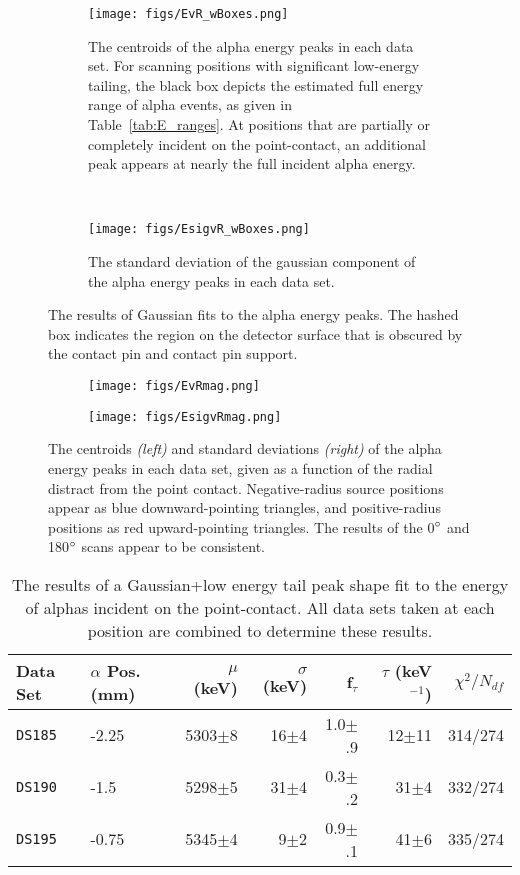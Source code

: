 \documentclass[groupedaddress,rmp,amsmath,amssymb,bibnotes,altaffilletter,twocolumn]{revtex4-1}
\begin{document}
\begin{figure*}[]
 \centering
  \begin{subfigure}[]{.45\textwidth}
 \texttt{[image: figs/EvR\_wBoxes.png]}
 \caption{The centroids of the alpha energy peaks in each data set. For scanning positions with significant low-energy tailing, the black box depicts the estimated full energy range of alpha events, as given in Table~\ref{tab:E_ranges}. At positions that are partially or completely incident on the point-contact, an additional peak appears at nearly the full incident alpha energy. } 
 \label{fig:Efit_mu}
\end{subfigure}
~
\begin{subfigure}[]{.45\textwidth}
 \texttt{[image: figs/EsigvR\_wBoxes.png]}
 \caption{The standard deviation of the gaussian component of the alpha energy peaks in each data set.} 
 \label{fig:Efit_sig}
 \end{subfigure}
 \caption{The results of Gaussian fits to the alpha energy peaks. The hashed box indicates the region on the detector surface that is obscured by the contact pin and contact pin support.}
\end{figure*}

\begin{figure*}[]
 \centering
 \begin{subfigure}[]{.45\textwidth}
 \texttt{[image: figs/EvRmag.png]}
\end{subfigure}
 \begin{subfigure}[]{.45\textwidth}
 \texttt{[image: figs/EsigvRmag.png]}
\end{subfigure}
 \caption{The centroids {\it (left)} and standard deviations {\it (right)} of the alpha energy peaks in each data set, given as a function of the radial distract from the point contact. Negative-radius source positions appear as blue downward-pointing triangles, and positive-radius positions as red upward-pointing triangles. The results of the 0$\degree$ and 180$\degree$ scans appear to be consistent.} 
 \label{fig:Efit_rMag}
\end{figure*}

\begin{table*}[]
\begin{center}
\begin{tabular}{l l r r r r r}
Data Set & $\alpha$ Pos. (mm) & $\mu$ (keV) & $\sigma$ (keV) & f$_{\tau}$ & $\tau$ (keV$^{-1}$)& $\chi^2/N_{df}$ \\  \hline
{\tt DS185} & -2.25 & 5303$\pm$8 & 16$\pm$4 & 1.0$\pm$.9 & 12$\pm$11 & 314/274 \\
{\tt DS190} & -1.5 & 5298$\pm$5 & 31$\pm$4 & 0.3$\pm$.2 & 31$\pm$4 & 332/274 \\
{\tt DS195} & -0.75 & 5345$\pm$4 & 9$\pm$2 & 0.9$\pm$.1 & 41$\pm$6 & 335/274 \\
\end{tabular}
\caption{The results of a Gaussian+low energy tail peak shape fit to the energy of alphas incident on the point-contact. All data sets taken at each position are combined to determine these results.} \label{tab:fullE_fitRes}
\end{center}
\end{table*}
\end{document}
